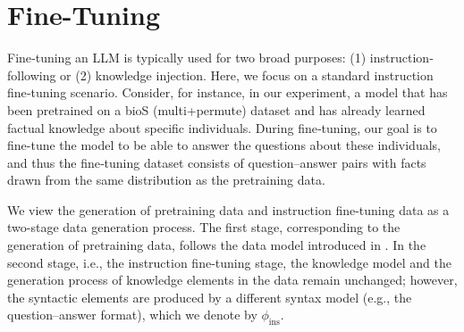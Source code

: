 \documentclass[11pt]{article}
\theoremstyle{plain}
\theoremstyle{definition}
\newcommand{\knwModel}{\phi_{\text{knw}}}
\newcommand{\instructionModel}{\phi_{\text{ins}}}
\begin{document}











\section{Fine-Tuning}
\label{sec:instruction}

Fine‐tuning an LLM is typically used for two broad purposes: (1) instruction‐following or (2) knowledge injection. Here, we focus on a standard instruction fine‐tuning scenario. Consider, for instance, in our experiment, a model that has been pretrained on a bioS (multi+permute) dataset \citep{allen2024physics}
and has already learned factual knowledge about specific individuals. During fine‐tuning, our goal is to fine-tune the model to be able to answer the questions about these individuals, and thus the fine‐tuning dataset consists of question–answer pairs with facts drawn from the same distribution as the pretraining data.








We view the generation of pretraining data and instruction fine-tuning data as a two-stage data generation process. 
The first stage, corresponding to the generation of pretraining data, follows the data model introduced in . 
In the second stage, i.e., the instruction fine-tuning stage, the knowledge model and the generation process of knowledge elements in the  data remain unchanged; however, the syntactic elements are produced by a different syntax model (e.g., the question–answer format), which we denote by \( \instructionModel \).
\end{document}
